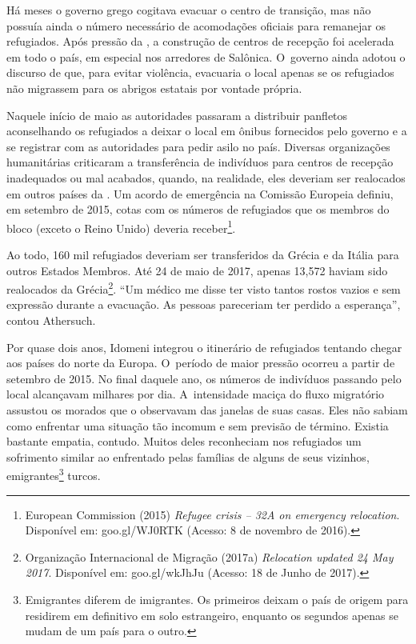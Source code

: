 Há meses o governo grego cogitava evacuar o centro de transição, mas não
possuía ainda o número necessário de acomodações oficiais para remanejar
os refugiados. Após pressão da , a construção de centros de recepção
foi acelerada em todo o país, em especial nos arredores de Salônica. O~governo ainda adotou o discurso de que, para evitar violência, evacuaria
o local apenas se os refugiados não migrassem para os abrigos estatais
por vontade própria.

Naquele início de maio as autoridades passaram a distribuir panfletos
aconselhando os refugiados a deixar o local em ônibus fornecidos pelo
governo e a se registrar com as autoridades para pedir asilo no
país. Diversas organizações humanitárias criticaram a transferência de
indivíduos para centros de recepção inadequados ou mal acabados, quando,
na realidade, eles deveriam ser realocados em outros países da . Um
acordo de emergência na Comissão Europeia definiu, em setembro de 2015,
cotas com os números de refugiados que os membros do bloco (exceto o
Reino Unido) deveria receber\footnote{ European Commission (2015) \emph{Refugee crisis
-- 32A on emergency relocation}. Disponível em:
goo.gl/WJ0RTK
(Acesso: 8
de novembro de 2016).}.

Ao todo, 160 mil refugiados deveriam ser transferidos da Grécia e da
Itália para outros Estados Membros. Até 24 de maio de 2017, apenas
13,572 haviam sido realocados da Grécia\footnote{ Organização Internacional de Migração (2017a)
\emph{Relocation updated 24 May 2017}. Disponível em:
goo.gl/wkJhJu
(Acesso: 18 de Junho de 2017).}. ``Um médico me
disse ter visto tantos rostos vazios e sem expressão durante a
evacuação. As pessoas pareceriam ter perdido a esperança'', contou
Athersuch.

Por quase dois anos, Idomeni integrou o itinerário de refugiados
tentando chegar aos países do norte da Europa. O~período de maior
pressão ocorreu a partir de setembro de 2015. No final daquele ano, os
números de indivíduos passando pelo local alcançavam milhares por dia. A~intensidade maciça do fluxo migratório assustou
os morados que o observavam das janelas de suas casas.
Eles não sabiam como enfrentar uma situação
tão incomum e sem previsão de término. Existia bastante empatia,
contudo. Muitos deles reconheciam nos refugiados um sofrimento similar
ao enfrentado pelas famílias de alguns de seus vizinhos,
emigrantes\footnote{ Emigrantes diferem de imigrantes. Os primeiros
deixam o país de origem para residirem em definitivo em solo
estrangeiro, enquanto os segundos apenas se mudam de um país para o
outro.}  turcos.

